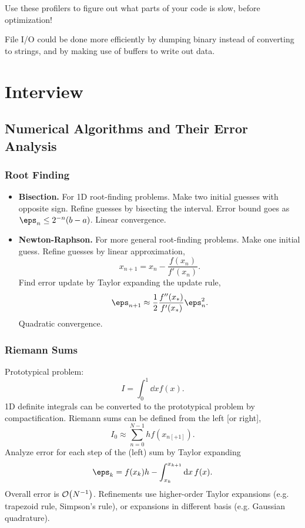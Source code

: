 \documentclass[12pt,letterpaper]{article}
\begin{document}
Use these profilers to figure out what parts of your code is slow, before optimization!

File I/O could be done more efficiently by dumping binary instead of converting to strings, and by making use of buffers to write out data.
\newpage
\appendix
\section{Interview}
\subsection{Numerical Algorithms and Their Error Analysis}
\subsubsection{Root Finding}
\begin{itemize}
    \item \textbf{Bisection.} For 1D root-finding problems. Make two initial guesses with opposite sign. Refine guesses by bisecting the interval. Error bound goes as $\eps_n\leq 2^{-n}(b-a)$. Linear convergence.
    \item \textbf{Newton-Raphson.} For more general root-finding problems. Make one initial guess. Refine guesses by linear approximation,
    \[x_{n+1}=x_n-\frac{f(x_n)}{f'(x_n)}.\]
    Find error update by Taylor expanding the update rule,
    \[\eps_{n+1}\approx\frac12\frac{f''(x_*)}{f'(x_*)}\eps_n^2.\]
    Quadratic convergence.
\end{itemize}
\subsubsection{Riemann Sums}
Prototypical problem:
\[I=\int_0^1\dd{x}f(x).\]
1D definite integrals can be converted to the prototypical problem by compactification. Riemann sums can be defined from the left [or right],
\[I_0\approx\sum_{n=0}^{N-1}hf(x_{n[+1]}).\]
Analyze error for each step of the (left) sum by Taylor expanding
\[\eps_k=f(x_k)h-\int_{x_k}^{x_{k+1}}\dd{x}f(x).\]
Overall error is $\order{N^{-1}}$. Refinements use higher-order Taylor expansions (e.g. trapezoid rule, Simpson's rule), or expansions in different basis (e.g. Gaussian quadrature).
\end{document}
